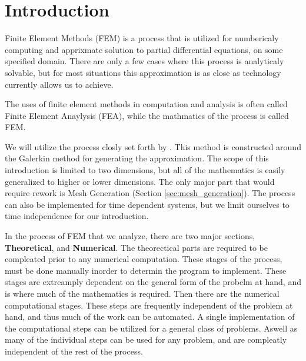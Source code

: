 \documentclass[../fem.tex]{subfiles}
\begin{document}
\section{Introduction}%
\label{sec:introduction}

Finite Element Methods (FEM) is a process that is utilized for
numbericaly computing and apprixmate solution to partial differential
equations, on some specified domain. There are only a few cases where this
process is analyticaly solvable, but for most situations this approximation is
as close as technology currently allows us to achieve.

The uses of finite element methods in computation and analysis is often called
Finite Element Anaylysis (FEA), while the mathmatics of the process is called
FEM.

We will utilize the process closly set forth by \cite{KH}. This method is
constructed around the Galerkin method for generating the approximation. The
scope of this introduction is limited to two dimensions, but all of the
mathematics is easily generalized to higher or lower dimensions. The only major
part that would require rework is Mesh Generation (Section
\ref{sec:mesh_generation}). The process can also be implemented for time
dependent systems, but we limit ourselves to time independence for our
introduction.

In the process of FEM that we analyze, there are two major sections,
\textbf{Theoretical}, and \textbf{Numerical}. The theorectical parts are
required to be compleated prior to any numerical computation. These stages of
the process, must be done manually inorder to determin the program to
implement. These stages are extreamply dependent on the general form of the
probelm at hand, and is where much of the mathematics is required. Then
there are the numerical computational stages. These steps are frequently
independent of the problem at hand, and thus much of the work can be automated.
A single implementation of the computational steps can be utilized for a
general class of problems. Aswell as many of the individual steps can be used
for any problem, and are compleatly independent of the rest of the process.
\end{document}
